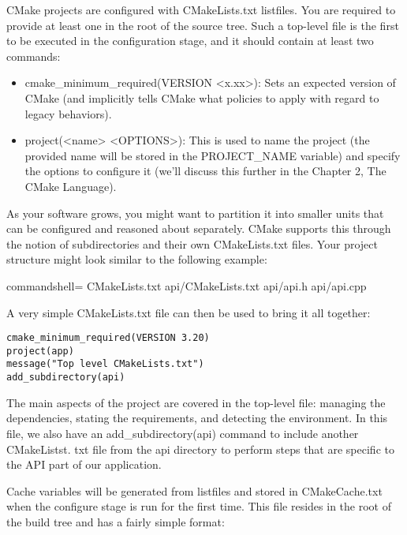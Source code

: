 
CMake projects are configured with CMakeLists.txt listfiles. You are required to provide at least one in the root of the source tree. Such a top-level file is the first to be executed in the configuration stage, and it should contain at least two commands:

\begin{itemize}
\item 
cmake\_minimum\_required(VERSION <x.xx>): Sets an expected version of CMake (and implicitly tells CMake what policies to apply with regard to legacy behaviors).

\item 
project(<name> <OPTIONS>): This is used to name the project (the provided name will be stored in the PROJECT\_NAME variable) and specify the options to configure it (we'll discuss this further in the Chapter 2, The CMake Language).
\end{itemize}

As your software grows, you might want to partition it into smaller units that can be configured and reasoned about separately. CMake supports this through the notion of subdirectories and their own CMakeLists.txt files. Your project structure might look similar to the following example:

\begin{tcblisting}{commandshell={}}
CMakeLists.txt
api/CMakeLists.txt
api/api.h
api/api.cpp
\end{tcblisting}

A very simple CMakeLists.txt file can then be used to bring it all together:

\begin{lstlisting}[style=styleCMake]
cmake_minimum_required(VERSION 3.20)
project(app)
message("Top level CMakeLists.txt")
add_subdirectory(api)
\end{lstlisting}

The main aspects of the project are covered in the top-level file: managing the dependencies, stating the requirements, and detecting the environment. In this file, we also have an add\_subdirectory(api) command to include another CMakeListst. txt file from the api directory to perform steps that are specific to the API part of our
application.


Cache variables will be generated from listfiles and stored in CMakeCache.txt when the configure stage is run for the first time. This file resides in the root of the build tree and has a fairly simple format:

